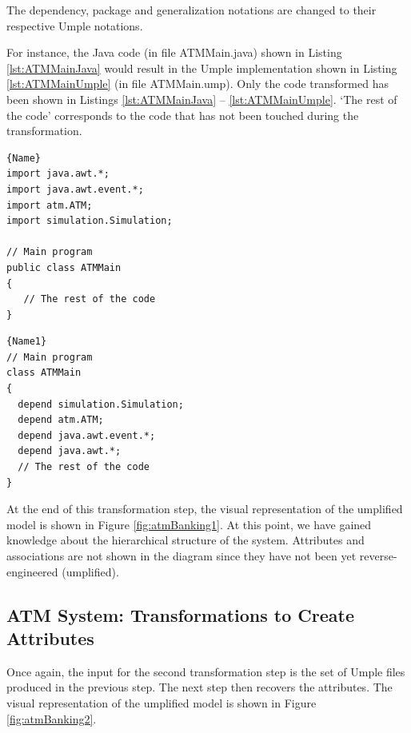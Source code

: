 The dependency, package and generalization notations are changed to their respective Umple notations.

For instance, the Java code (in file ATMMain.java) shown in Listing  \ref{lst:ATMMainJava} would result in the Umple implementation shown in Listing  \ref{lst:ATMMainUmple} (in file ATMMain.ump). Only the code transformed has been shown in Listings \ref{lst:ATMMainJava} -- \ref{lst:ATMMainUmple}. `The rest of the code' corresponds to the code that has not been touched during the transformation. 

\noindent\begin{minipage}{.45\textwidth}
\begin{lstlisting}[style=java,caption=ATMMain.java,label=lst:ATMMainJava]{Name}
import java.awt.*;
import java.awt.event.*;
import atm.ATM;
import simulation.Simulation;

// Main program  
public class ATMMain
{
   // The rest of the code
}
\end{lstlisting}
\end{minipage}\hfill
\begin{minipage}{.45\textwidth}
\begin{lstlisting}[style=UmpleIn,caption=ATMMain.ump,label=lst:ATMMainUmple]{Name1}
// Main program  
class ATMMain
{
  depend simulation.Simulation;
  depend atm.ATM;
  depend java.awt.event.*;
  depend java.awt.*;
  // The rest of the code
}
\end{lstlisting}
\end{minipage}

At the end of this transformation step, the visual representation of the umplified model is shown in Figure \ref{fig:atmBanking1}. At this point, we have gained knowledge about the hierarchical structure of the system. Attributes and associations are not shown in the diagram since they have not been yet reverse-engineered (umplified).

\subsection{ATM System: Transformations to Create Attributes}

Once again, the input for the second transformation step is the set of Umple files produced in the previous step. The next step then recovers the attributes. The visual representation of the umplified model is shown in Figure \ref{fig:atmBanking2}.

